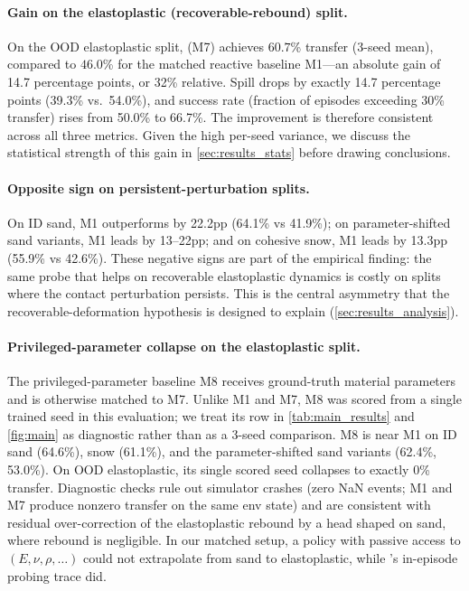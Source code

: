 \paragraph{Gain on the elastoplastic (recoverable-rebound) split.}
On the OOD elastoplastic split, \PTA{} (M7) achieves $60.7$\% transfer (3-seed mean), compared to $46.0$\% for the matched reactive baseline M1---an absolute gain of 14.7 percentage points, or 32\% relative. Spill drops by exactly 14.7 percentage points (39.3\% vs.\ 54.0\%), and success rate (fraction of episodes exceeding 30\% transfer) rises from 50.0\% to 66.7\%. The improvement is therefore consistent across all three metrics. Given the high per-seed variance, we discuss the statistical strength of this gain in \cref{sec:results_stats} before drawing conclusions.

\paragraph{Opposite sign on persistent-perturbation splits.}
On ID sand, M1 outperforms \PTA{} by 22.2pp (64.1\% vs 41.9\%); on parameter-shifted sand variants, M1 leads by 13--22pp; and on cohesive snow, M1 leads by 13.3pp (55.9\% vs 42.6\%). These negative signs are part of the empirical finding: the same probe that helps on recoverable elastoplastic dynamics is costly on splits where the contact perturbation persists. This is the central asymmetry that the recoverable-deformation hypothesis is designed to explain (\cref{sec:results_analysis}).

\paragraph{Privileged-parameter collapse on the elastoplastic split.}
The privileged-parameter baseline M8 receives ground-truth material parameters and is otherwise matched to M7. Unlike M1 and M7, M8 was scored from a single trained seed in this evaluation; we treat its row in \cref{tab:main_results} and \cref{fig:main} as diagnostic rather than as a 3-seed comparison. M8 is near M1 on ID sand (64.6\%), snow (61.1\%), and the parameter-shifted sand variants (62.4\%, 53.0\%). On OOD elastoplastic, its single scored seed collapses to exactly 0\% transfer. Diagnostic checks rule out simulator crashes (zero NaN events; M1 and M7 produce nonzero transfer on the same env state) and are consistent with residual over-correction of the elastoplastic rebound by a head shaped on sand, where rebound is negligible. In our matched setup, a policy with passive access to $(E, \nu, \rho, \dots)$ could not extrapolate from sand to elastoplastic, while \PTA{}'s in-episode probing trace did.

